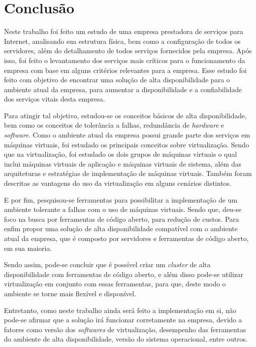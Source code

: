 \chapter{Conclusão}
\label{cap:conclusao}

Neste trabalho foi feito um estudo de uma empresa prestadora de serviços para Internet, analisando sua estrutura física, bem como a configuração
de todos os servidores, além do detalhamento de todos serviços fornecidos pela empresa. Após isso, foi feito o levantamento dos serviços mais 
críticos para o funcionamento da empresa com base em alguns critérios relevantes para a empresa. Esse estudo foi feito com objetivo de encontrar 
uma solução de alta disponibilidade para o ambiente atual da empresa, para aumentar a disponibilidade e a confiabilidade dos serviços vitais desta 
empresa.

Para atingir tal objetivo, estudou-se os conceitos básicos de alta disponibilidade, bem como os conceitos de tolerância a falhas, redundância de
\textit{hardware} e \textit{software}. Como o ambiente atual da empresa possui grande parte dos serviços em máquinas virtuais, foi estudado
os principais conceitos sobre virtualização. Sendo que na virtualização, foi estudado os dois grupos de máquinas virtuais o qual inclui máquinas 
virtuais de aplicação e máquinas virtuais de sistema, além das arquiteturas e estratégias de implementação de máquinas virtuais. Também foram 
descritas as vantagens do uso da virtualização em alguns cenários distintos.

E por fim, pesquisou-se ferramentas para possibilitar a implementação de um ambiente tolerante a falhas com o uso de máquinas virtuais.
Sendo que, deu-se foco na busca por ferramentas de código aberto, para redução de custos. Para enfim propor uma solução de alta disponibilidade 
compatível com o ambiente atual da empresa, que é composto por servidores e ferramentas de código aberto, em sua maioria.

Sendo assim, pode-se concluir que é possível criar um \textit{cluster} de alta disponibilidade com ferramentas de código aberto, e além disso 
pode-se utilizar virtualização em conjunto com essas ferramentas, para que, deste modo o ambiente se torne mais flexível e disponível. 

Entretanto, como neste trabalho ainda será feito a implementação em si, não pode-se afirmar que a solução irá funcionar corretamente
na empresa, devido a fatores como versão dos \textit{softwares} de virtualização, desempenho das ferramentas do ambiente de alta disponibilidade, 
versão do sistema operacional, entre outros.

